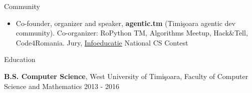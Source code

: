 \documentclass{resume}
\begin{document}
\begin{rSection}{Community}
    \begin{itemize}
       \setlength\itemsep{-0.3em}
       \item Co-founder, organizer and speaker, \textbf{agentic.tm} (Timi\c{s}oara agentic dev community). Co-organizer: RoPython TM, Algorithms Meetup, Hack\&Tell, Code4Romania. Jury, \href{https://infoeducatie.ro}{Infoeducatie} National CS Contest
    \end{itemize}
\end{rSection}

\begin{rSection}{Education}
\item \textbf{B.S. Computer Science}, West University of Timi\c{s}oara, Faculty of Computer Science and Mathematics \hfill 2013 - 2016
\end{rSection}
\end{document}
